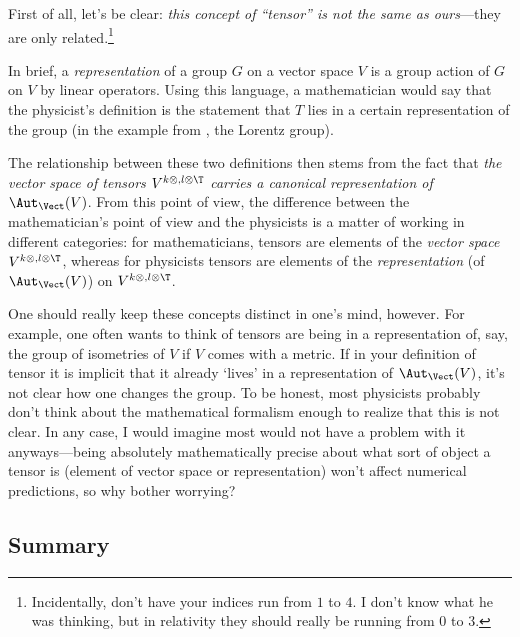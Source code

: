 First of all, let's be clear:  \emph{this concept of ``tensor'' is \emph{not} the same as ours}---they are only related.\footnote{Incidentally, don't have your indices run from $1$ to $4$.  I don't know what he was thinking, but in relativity they should really be running from $0$ to $3$.}

In brief, a \emph{representation} of a group $G$ on a vector space $V$ is a group action of $G$ on $V$ by linear operators.  Using this language, a mathematician would say that the physicist's definition is the statement that $T$ lies in a certain representation of the group (in the example from \cite{Taylor}, the Lorentz group).

The relationship between these two definitions then stems from the fact that \emph{the vector space of tensors $V^{k\otimes ,l\otimes \T}$ carries a canonical representation of $\Aut _{\Vect}(V)$}.  From this point of view, the difference between the mathematician's point of view and the physicists is a matter of working in different categories:  for mathematicians, tensors are elements of the \emph{vector space} $V^{k\otimes ,l\otimes \T}$, whereas for physicists tensors are elements of the \emph{representation} (of $\Aut _{\Vect}(V)$) on $V^{k\otimes ,l\otimes \T}$.

One should really keep these concepts distinct in one's mind, however.  For example, one often wants to think of tensors are being in a representation of, say, the group of isometries of $V$ if $V$ comes with a metric.  If in your definition of tensor it is implicit that it already `lives' in a representation of $\Aut _{\Vect}(V)$, it's not clear how one changes the group.  To be honest, most physicists probably don't think about the mathematical formalism enough to realize that this is not clear.  In any case, I would imagine most would not have a problem with it anyways---being absolutely mathematically precise about what sort of object a tensor is (element of vector space or representation) won't affect numerical predictions, so why bother worrying?

\subsection{Summary}

